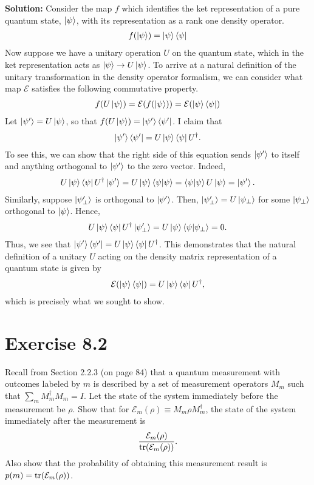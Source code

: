 \documentclass{book}
\newcommand{\mc}[1]{\mathcal{#1}}
\begin{document}
    \textbf{Solution:} Consider the map $f$ which identifies the ket representation of a pure quantum state, $\ket{\psi}$, with its representation as a rank one density operator.
    \begin{align}
        f(\ket{\psi}) = \ket{\psi}\bra{\psi}
    \end{align}
    Now suppose we have a unitary operation $U$ on the quantum state, which in the ket representation acts as $\ket{\psi}\to U\ket{\psi}$. To arrive at a natural definition of the unitary transformation in the density operator formalism, we can consider what map $\mc{E}$ satisfies the following commutative property.
    \begin{align}
        f(U\ket{\psi}) = \mc{E}(f(\ket{\psi})) = \mc{E}(\ket{\psi}\bra{\psi})
    \end{align}
    Let $\ket{\psi'} = U\ket{\psi}$, so that $f(U\ket{\psi}) = \ket{\psi'}\bra{\psi'}$. I claim that
    \begin{align}
        \ket{\psi'}\bra{\psi'} = U \ket{\psi}\bra{\psi} U^\dagger.
    \end{align}
    To see this, we can show that the right side of this equation sends $\ket{\psi'}$ to itself and anything orthogonal to $\ket{\psi'}$ to the zero vector. Indeed,
    \begin{align}
        U\ket{\psi}\bra{\psi}U^\dagger \ket{\psi'} = U \ket{\psi}\bra{\psi}\ket{\psi} = \bra{\psi}\ket{\psi} U \ket{\psi} = \ket{\psi'}.
    \end{align}
    Similarly, suppose $\ket{\psi'_\perp}$ is orthogonal to $\ket{\psi'}$. Then, $\ket{\psi'_\perp} = U \ket{\psi_\perp}$ for some $\ket{\psi_\perp}$ orthogonal to $\ket{\psi}$. Hence,
    \begin{align}
         U\ket{\psi}\bra{\psi}U^\dagger \ket{\psi'_\perp} = U\ket{\psi}\bra{\psi} \ket{\psi_\perp} = 0.
    \end{align}
    Thus, we see that $\ket{\psi'}\bra{\psi'} = U\ket{\psi}\bra{\psi}U^\dagger$. This demonstrates that the natural definition of a unitary $U$ acting on the density matrix representation of a quantum state is given by
    \begin{align}
        \mc{E}(\ket{\psi}\bra{\psi}) = U\ket{\psi}\bra{\psi}U^\dagger,
    \end{align}
    which is precisely what we sought to show. 
    
    \section*{Exercise 8.2} 
    Recall from Section 2.2.3 (on page 84) that a quantum measurement with outcomes labeled by $m$ is described by a set of measurement operators $M_m$ such that $\sum_m M_m^\dagger M_m = I$. Let the state of the system immediately before the measurement be $\rho$. Show that for $\mc{E}_m(\rho) \equiv M_m \rho M_m^\dagger$, the state of the system immediately after the measurement is
    \begin{align} \label{eq:Exercise 8.2 final state}
        \frac{\mc{E}_m(\rho)}{\tr(\mc{E}_m(\rho))}.
    \end{align}
    Also show that the probability of obtaining this measurement result is $p(m) = \tr(\mc{E}_m(\rho))$.
    
\end{document}
